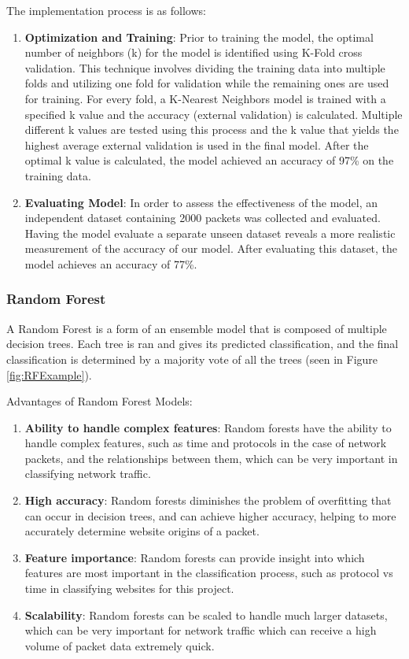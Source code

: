 \documentclass[10pt,sigconf,letterpaper,nonacm]{acmart}
\begin{document}
The implementation process is as follows: 
\begin{enumerate}
  \item \textbf{Optimization and Training}: Prior to training the model, the optimal number of neighbors (k) for the model is identified using K-Fold cross validation. This technique involves dividing the training data into multiple folds and utilizing one fold for validation while the remaining ones are used for training. For every fold, a K-Nearest Neighbors model is trained with a specified k value and the accuracy (external validation) is calculated. Multiple different k values are tested using this process and the k value that yields the highest average external validation is used in the final model. After the optimal k value is calculated, the model achieved an accuracy of 97\% on the training data. 
  
  \item \textbf{Evaluating Model}: In order to assess the effectiveness of the model, an independent dataset containing 2000 packets was collected and evaluated. Having the model evaluate a separate unseen dataset reveals a more realistic measurement of the accuracy of our model. After evaluating this dataset, the model achieves an accuracy of 77\%.
\end{enumerate}

\subsubsection{Random Forest}
A Random Forest is a form of an ensemble model that is composed of multiple decision trees. Each tree is ran and gives its predicted classification, and the final classification is determined by a majority vote of all the trees (seen in Figure \ref{fig:RFExample}).

Advantages of Random Forest Models:
\begin{enumerate}
  \item \textbf{Ability to handle complex features}: Random forests have the ability to handle complex features, such as time and protocols in the case of network packets, and the relationships between them, which can be very important in classifying network traffic.
  \item \textbf{High accuracy}: Random forests diminishes the problem of overfitting that can occur in decision trees, and can achieve higher accuracy, helping to more accurately determine website origins of a packet.
  \item \textbf{Feature importance}: Random forests can provide insight into which features are most important in the classification process, such as protocol vs time in classifying websites for this project.
  \item \textbf{Scalability}: Random forests can be scaled to handle much larger datasets, which can be very important for network traffic which can receive a high volume of packet data extremely quick.
\end{enumerate}
\end{document}
